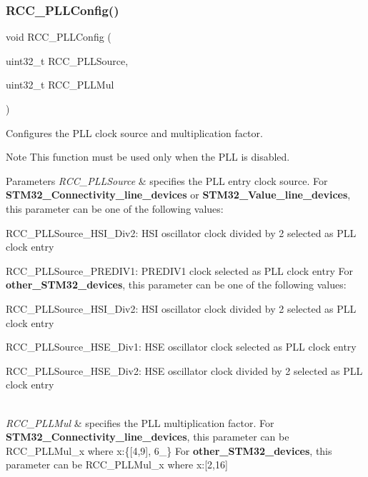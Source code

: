 \subsubsection{\texorpdfstring{R\+C\+C\+\_\+\+P\+L\+L\+Config()}{RCC\_PLLConfig()}}
{\footnotesize\ttfamily void R\+C\+C\+\_\+\+P\+L\+L\+Config (\begin{DoxyParamCaption}\item[{uint32\+\_\+t}]{R\+C\+C\+\_\+\+P\+L\+L\+Source,  }\item[{uint32\+\_\+t}]{R\+C\+C\+\_\+\+P\+L\+L\+Mul }\end{DoxyParamCaption})}



Configures the P\+LL clock source and multiplication factor. 

\begin{DoxyNote}{Note}
This function must be used only when the P\+LL is disabled. 
\end{DoxyNote}

\begin{DoxyParams}{Parameters}
{\em R\+C\+C\+\_\+\+P\+L\+L\+Source} & specifies the P\+LL entry clock source. For {\bfseries S\+T\+M32\+\_\+\+Connectivity\+\_\+line\+\_\+devices} or {\bfseries S\+T\+M32\+\_\+\+Value\+\_\+line\+\_\+devices}, this parameter can be one of the following values\+: \begin{DoxyItemize}
\item R\+C\+C\+\_\+\+P\+L\+L\+Source\+\_\+\+H\+S\+I\+\_\+\+Div2\+: H\+SI oscillator clock divided by 2 selected as P\+LL clock entry \item R\+C\+C\+\_\+\+P\+L\+L\+Source\+\_\+\+P\+R\+E\+D\+I\+V1\+: P\+R\+E\+D\+I\+V1 clock selected as P\+LL clock entry For {\bfseries other\+\_\+\+S\+T\+M32\+\_\+devices}, this parameter can be one of the following values\+: \item R\+C\+C\+\_\+\+P\+L\+L\+Source\+\_\+\+H\+S\+I\+\_\+\+Div2\+: H\+SI oscillator clock divided by 2 selected as P\+LL clock entry \item R\+C\+C\+\_\+\+P\+L\+L\+Source\+\_\+\+H\+S\+E\+\_\+\+Div1\+: H\+SE oscillator clock selected as P\+LL clock entry \item R\+C\+C\+\_\+\+P\+L\+L\+Source\+\_\+\+H\+S\+E\+\_\+\+Div2\+: H\+SE oscillator clock divided by 2 selected as P\+LL clock entry \end{DoxyItemize}
\\
\hline
{\em R\+C\+C\+\_\+\+P\+L\+L\+Mul} & specifies the P\+LL multiplication factor. For {\bfseries S\+T\+M32\+\_\+\+Connectivity\+\_\+line\+\_\+devices}, this parameter can be R\+C\+C\+\_\+\+P\+L\+L\+Mul\+\_\+x where x\+:\{\mbox{[}4,9\mbox{]}, 6\+\_\} For {\bfseries other\+\_\+\+S\+T\+M32\+\_\+devices}, this parameter can be R\+C\+C\+\_\+\+P\+L\+L\+Mul\+\_\+x where x\+:\mbox{[}2,16\mbox{]} \\
\hline
\end{DoxyParams}

